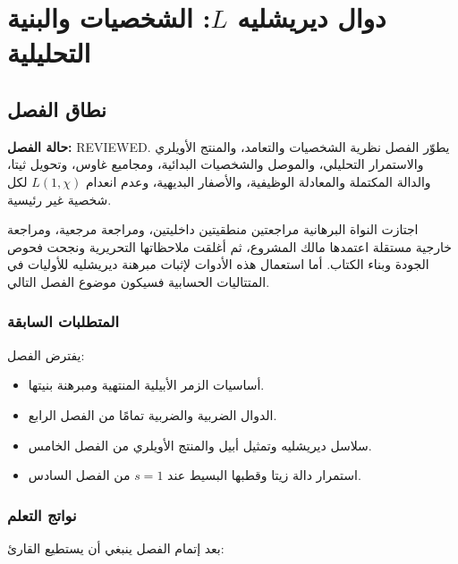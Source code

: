 \chapter{دوال ديريشليه \(L\): الشخصيات والبنية التحليلية}

\section{نطاق الفصل}

\noindent\textbf{حالة الفصل:} \textenglish{REVIEWED}. يطوّر الفصل نظرية
الشخصيات والتعامد، والمنتج الأويلري والاستمرار التحليلي، والموصل والشخصيات
البدائية، ومجاميع غاوس، وتحويل ثيتا، والدالة المكتملة والمعادلة الوظيفية،
والأصفار البديهية، وعدم انعدام \(L(1,\chi)\) لكل شخصية غير رئيسية.

اجتازت النواة البرهانية مراجعتين منطقيتين داخليتين، ومراجعة مرجعية،
ومراجعة خارجية مستقلة اعتمدها مالك المشروع، ثم أغلقت ملاحظاتها التحريرية
ونجحت فحوص الجودة وبناء الكتاب. أما استعمال هذه الأدوات لإثبات مبرهنة
ديريشليه للأوليات في المتتاليات الحسابية فسيكون موضوع الفصل التالي.

\subsection{المتطلبات السابقة}

يفترض الفصل:

\begin{itemize}
  \item أساسيات الزمر الأبيلية المنتهية ومبرهنة بنيتها.
  \item الدوال الضربية والضربية تمامًا من الفصل الرابع.
  \item سلاسل ديريشليه وتمثيل أبيل والمنتج الأويلري من الفصل الخامس.
  \item استمرار دالة زيتا وقطبها البسيط عند \(s=1\) من الفصل السادس.
\end{itemize}

\subsection{نواتج التعلم}

بعد إتمام الفصل ينبغي أن يستطيع القارئ:

